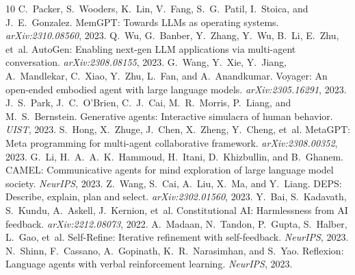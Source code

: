 \documentclass[11pt]{article}
\begin{document}

\begin{thebibliography}{10}
 C.~Packer, S.~Wooders, K.~Lin, V.~Fang, S.~G.~Patil, I.~Stoica, and J.~E.~Gonzalez. MemGPT: Towards LLMs as operating systems. \textit{arXiv:2310.08560}, 2023.
 Q.~Wu, G.~Banber, Y.~Zhang, Y.~Wu, B.~Li, E.~Zhu, et~al. AutoGen: Enabling next-gen LLM applications via multi-agent conversation. \textit{arXiv:2308.08155}, 2023.
 G.~Wang, Y.~Xie, Y.~Jiang, A.~Mandlekar, C.~Xiao, Y.~Zhu, L.~Fan, and A.~Anandkumar. Voyager: An open-ended embodied agent with large language models. \textit{arXiv:2305.16291}, 2023.
 J.~S.~Park, J.~C.~O'Brien, C.~J.~Cai, M.~R.~Morris, P.~Liang, and M.~S.~Bernstein. Generative agents: Interactive simulacra of human behavior. \textit{UIST}, 2023.
 S.~Hong, X.~Zhuge, J.~Chen, X.~Zheng, Y.~Cheng, et~al. MetaGPT: Meta programming for multi-agent collaborative framework. \textit{arXiv:2308.00352}, 2023.
 G.~Li, H.~A.~A.~K.~Hammoud, H.~Itani, D.~Khizbullin, and B.~Ghanem. CAMEL: Communicative agents for mind exploration of large language model society. \textit{NeurIPS}, 2023.
 Z.~Wang, S.~Cai, A.~Liu, X.~Ma, and Y.~Liang. DEPS: Describe, explain, plan and select. \textit{arXiv:2302.01560}, 2023.
 Y.~Bai, S.~Kadavath, S.~Kundu, A.~Askell, J.~Kernion, et~al. Constitutional AI: Harmlessness from AI feedback. \textit{arXiv:2212.08073}, 2022.
 A.~Madaan, N.~Tandon, P.~Gupta, S.~Halber, L.~Gao, et~al. Self-Refine: Iterative refinement with self-feedback. \textit{NeurIPS}, 2023.
 N.~Shinn, F.~Cassano, A.~Gopinath, K.~R.~Narasimhan, and S.~Yao. Reflexion: Language agents with verbal reinforcement learning. \textit{NeurIPS}, 2023.
\end{thebibliography}
\end{document}
